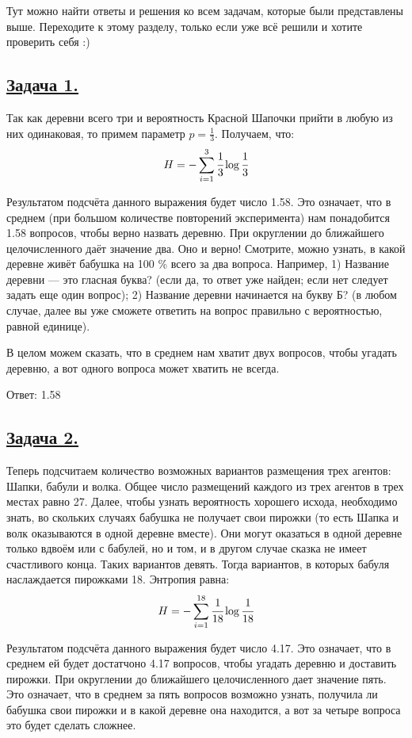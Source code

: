 Тут можно найти ответы и решения ко всем задачам, которые были представлены выше. Переходите к этому разделу, только если уже всё решили и хотите проверить себя :)

\subsection*{\hyperref[sec:problem1]{Задача 1.}}\label{sec:sol_problem1}

Так как деревни всего три и вероятность Красной Шапочки прийти в любую из них одинаковая, то примем параметр $p = \frac{1}{3}$. Получаем, что:
\[H=-\sum\limits_{i=1}^3 \cfrac{1}{3}\log \cfrac{1}{3} \]

Результатом подсчёта данного выражения будет число 1.58. Это означает, что в среднем (при большом количестве повторений эксперимента) нам понадобится 1.58 вопросов, чтобы верно назвать деревню. При округлении до ближайшего целочисленного даёт значение два. Оно и верно! Смотрите, можно узнать, в какой деревне живёт бабушка на 100 \%  всего за два вопроса. Например, 1) Название деревни --- это гласная буква? (если да, то ответ уже найден; если нет следует задать еще один вопрос); 2) Название деревни начинается на букву Б? (в любом случае, далее вы уже сможете ответить на вопрос правильно с вероятностью, равной единице). 

В целом можем сказать, что в среднем нам хватит двух вопросов, чтобы угадать деревню, а вот одного вопроса может хватить не всегда. 

Ответ: 1.58

\subsection*{\hyperref[sec:problem2]{Задача 2.}}\label{sec:sol_problem2}

Теперь подсчитаем количество возможных вариантов размещения трех агентов: Шапки, бабули и волка. Общее число размещений каждого из трех агентов в трех местах равно 27. 
Далее, чтобы узнать вероятность хорошего исхода, необходимо знать, во скольких случаях бабушка не получает свои пирожки (то есть Шапка и волк оказываются в одной деревне вместе). Они могут оказаться в одной деревне только вдвоём или с бабулей, но и том, и в другом случае сказка не имеет счастливого конца. Таких вариантов девять. Тогда вариантов, в которых бабуля наслаждается пирожками 18.
Энтропия равна:
\[H=-\sum\limits_{i=1}^{18}  \cfrac{1}{18}\log \cfrac{1}{18} \]

Результатом подсчёта данного выражения будет число 4.17. Это означает, что в среднем ей будет достатчоно 4.17 вопросов, чтобы угадать деревню и доставить пирожки. При округлении до ближайшего целочисленного дает значение пять. Это означает, что в среднем за пять вопросов возможно узнать, получила ли бабушка свои пирожки и в какой деревне она находится, а вот за четыре вопроса это будет сделать сложнее. 

